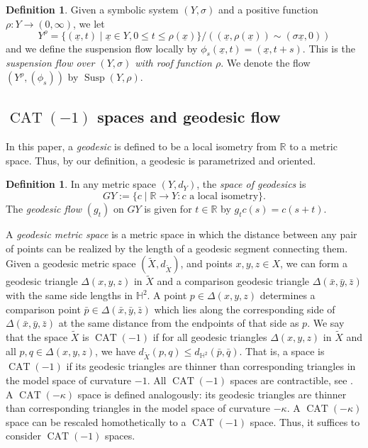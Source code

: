 \documentclass[10pt]{amsart}
\let\sep\mid
\theoremstyle{definition}
\newtheorem{defn}[thm]{Definition}
\numberwithin{equation}{section}
\DeclareMathOperator{\CAT}{CAT}
\DeclareMathOperator{\Susp}{Susp}
\begin{document}
\begin{defn}
Given a symbolic system $(Y, \sigma)$ and a positive function $\rho: Y \to (0,\infty)$, we let
\[
Y^{\rho} = \{ (\underline x,t)\sep \underline x\in Y, 0\leq t \leq \rho(\underline x) \}\big/((\underline x, \rho(\underline x))\sim(\sigma \underline x,0))\]
and we define the suspension flow locally by $\phi_s(\underline x, t) = (\underline x, t+s).$ This is the \emph{suspension flow over $(Y, \sigma)$ with roof function $\rho$}. We denote the flow $(Y^{\rho}, (\phi_s))$ by $\Susp(Y, \rho)$.
\end{defn}

\subsection{$\CAT(-1)$ spaces and geodesic flow}\label{subsec:CAT (-1)}

In this paper, a \emph{geodesic} is defined to be a local isometry from $\mathbb{R}$ to a metric space. Thus, by our definition, a geodesic is parametrized and oriented.

\begin{defn}
In any metric space $(Y,d_Y)$, the \emph{space of geodesics} is
\[ GY:= \{ c\sep\mathbb{R} \rightarrow Y : c \text{ a local isometry}\}.\]
The \emph{geodesic flow} $(g_t)$ on $GY$ is given for $t \in \mathbb R$ by $g_tc(s) = c(s+t)$.
\end{defn}

A \emph{geodesic metric space} is a metric space in which the distance between any pair of points can be realized by the length of a geodesic segment connecting them. Given a geodesic metric space $(\tilde X,d_{\tilde X})$, and points $x,y,z \in X$, we can form a geodesic triangle $\Delta(x,y,z)$ in $\tilde X$ and a comparison geodesic triangle $\Delta(\bar x, \bar y, \bar z)$ with the same side lengths in $\mathbb{H}^2$. A point $p \in \Delta(x,y,z)$ determines a comparison point $\bar p \in \Delta(\bar x, \bar y, \bar z)$ which lies along the corresponding side of $\Delta(\bar x, \bar y, \bar z)$ at the same distance from the endpoints of that side as $p$. We say that the space $\tilde X$ is $\CAT(-1)$ if for all geodesic triangles $\Delta(x,y,z)$ in $\tilde X$ and all $p,q \in \Delta(x,y,z)$, we have $d_{\tilde X}(p,q)\leq d_{\mathbb{H}^2}(\bar p, \bar q)$. That is, a space is $\CAT(-1)$ if its geodesic triangles are thinner than corresponding triangles in the model space of curvature $-1$. All $\CAT(-1)$ spaces are contractible, see \eg \cite[Chap.\,3, Props\,28 \&\,29]{troyanov}. A $\CAT(-\kappa)$ space is defined analogously: its geodesic triangles are thinner than corresponding triangles in the model space of curvature $-\kappa$. A $\CAT(- \kappa)$ space can be rescaled homothetically to a $\CAT(-1)$ space. Thus, it suffices to consider $\CAT(-1)$ spaces.
\end{document}
